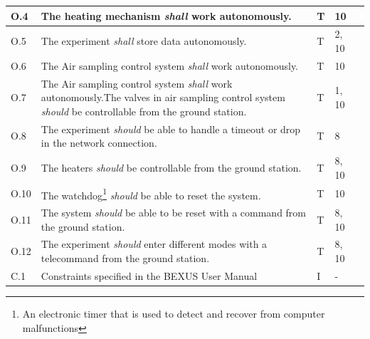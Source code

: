 \documentclass[a4paper,12pt,twoside]{article}
\begin{document}
\begin{longtable}[]{|m{}| m{} |m{} |m{}|m{}|}
O.4  & The heating mechanism \textit{shall} work autonomously.                                                                                                               &        T      & 10            &        \\ \hline
O.5  & The experiment \textit{shall} store data autonomously.                                                                                                                &       T       & 2, 10            &        \\ \hline
O.6  & The Air sampling control system \textit{shall} work autonomously.                                                                                                     &        T      & 10            &        \\ \hline
O.7  & The Air sampling control system \textit{shall} work autonomously.The valves in air sampling control system \textit{should} be controllable from the ground station. &      T        & 1, 10            &        \\ \hline
O.8  & The experiment \textit{should} be able to handle a timeout or drop in the network connection.                                                                         &    T          &  8           &        \\ \hline
O.9  & The heaters \textit{should} be controllable from the ground station.                                                                                                  &     T         &  8, 10           &        \\ \hline
O.10 & The watchdog\footnote{An electronic timer that is used to detect and recover from computer malfunctions} \textit{should} be able to reset the system.               &     T         & 10            &        \\ \hline
O.11 & The system \textit{should} be able to be reset with a command from the ground station.                                                                                &     T         & 8, 10            &        \\ \hline
O.12 & The experiment \textit{should} enter different modes with a telecommand from the ground station.                                                                      &      T        & 8, 10            &        \\ \hline
C.1  & Constraints specified in the BEXUS User Manual                                                                                                                          &       I       & -            &        \\ \hline

\end{longtable}
\end{document}

